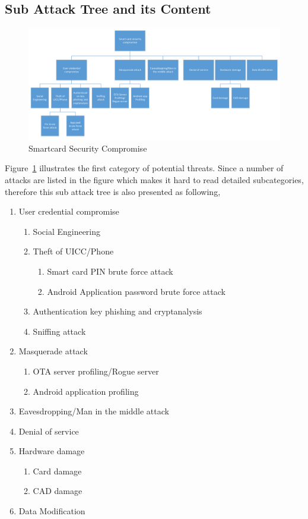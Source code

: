 \subsection{Sub Attack Tree and its Content}
 \begin{figure}[!htb]
	\centering
	\includegraphics[width=1.0\textwidth]{attack-tree-smartcard}
		\caption{Smartcard Security Compromise}
	\label{fig:attack-tree-smartcard}
\end{figure}
Figure~\ref{fig:attack-tree-smartcard} illustrates the first category of potential threats. Since a number of attacks are listed in the figure which makes it hard to read detailed subcategories, therefore this sub attack tree is also presented as following,

\begin{enumerate}
	\item User credential compromise
  	\begin{enumerate}
    	\item Social Engineering
	\item Theft of UICC/Phone
		\begin{enumerate}
		\item Smart card PIN brute force attack
		\item Android Application password brute force attack
		\end{enumerate}
    	\item Authentication key phishing and cryptanalysis
    	\item Sniffing attack
	\end{enumerate}
	\item Masquerade attack
		\begin{enumerate}
		\item OTA server profiling/Rogue server
		\item Android application profiling
		\end{enumerate}
	\item Eavesdropping/Man in the middle attack
	\item Denial of service
	\item Hardware damage
		\begin{enumerate}
		\item Card  damage
		\item CAD damage
		\end{enumerate}
	\item  Data Modification
\end{enumerate}


